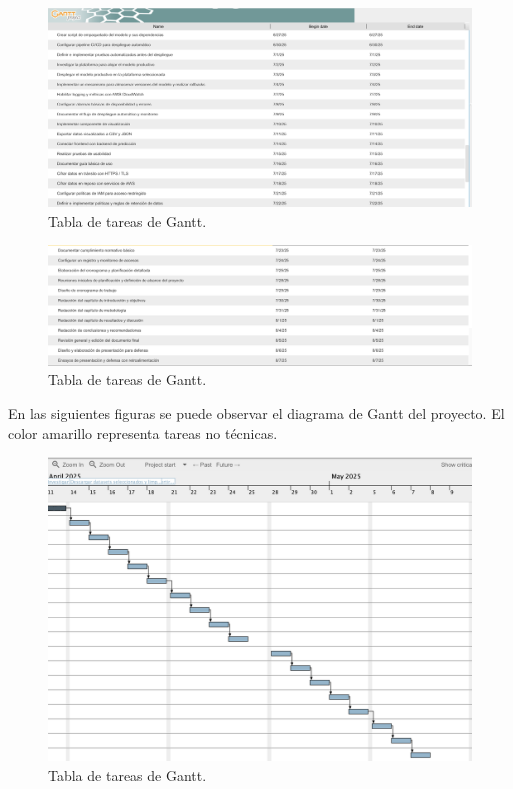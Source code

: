 \documentclass[
11pt, %
]{charter}
\begin{document}
\begin{figure}[htpb]
\centering 
\includegraphics[width=.99\textwidth]{./Figuras/tareas-4.png}
\caption{Tabla de tareas de Gantt.}
\label{fig:diagBloques}
\end{figure}


\begin{figure}[htpb]
\centering 
\includegraphics[width=.99\textwidth]{./Figuras/tareas-5.png}
\caption{Tabla de tareas de Gantt.}
\label{fig:diagBloques}
\end{figure}

\clearpage
En las siguientes figuras se puede observar el diagrama de Gantt del proyecto. El color amarillo representa tareas no técnicas.

\begin{figure}[htpb]
\centering 
\includegraphics[width=.99\textwidth]{./Figuras/gantt-1.png}
\caption{Tabla de tareas de Gantt.}
\label{fig:diagBloques}
\end{figure}
\end{document}
